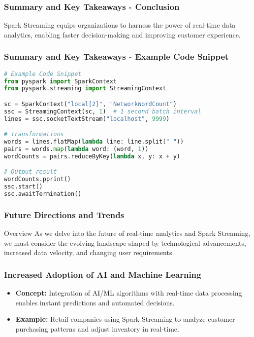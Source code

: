 \documentclass[aspectratio=169]{beamer}
\begin{document}
\begin{frame}
    \frametitle{Summary and Key Takeaways - Conclusion}
    Spark Streaming equips organizations to harness the power of real-time data analytics, enabling faster decision-making and improving customer experience.
\end{frame}

\begin{frame}[fragile]
    \frametitle{Summary and Key Takeaways - Example Code Snippet}
    \begin{lstlisting}[language=python]
# Example Code Snippet
from pyspark import SparkContext
from pyspark.streaming import StreamingContext

sc = SparkContext("local[2]", "NetworkWordCount")
ssc = StreamingContext(sc, 1)  # 1 second batch interval
lines = ssc.socketTextStream("localhost", 9999)

# Transformations
words = lines.flatMap(lambda line: line.split(" "))
pairs = words.map(lambda word: (word, 1))
wordCounts = pairs.reduceByKey(lambda x, y: x + y)

# Output result
wordCounts.pprint()
ssc.start()
ssc.awaitTermination()
    \end{lstlisting}
\end{frame}

\begin{frame}[fragile]
    \frametitle{Future Directions and Trends}
    \begin{block}{Overview}
        As we delve into the future of real-time analytics and Spark Streaming, we must consider the evolving landscape shaped by technological advancements, increased data velocity, and changing user requirements.
    \end{block}
\end{frame}

\begin{frame}[fragile]
    \frametitle{Increased Adoption of AI and Machine Learning}
    \begin{itemize}
        \item \textbf{Concept:} Integration of AI/ML algorithms with real-time data processing enables instant predictions and automated decisions.
        \item \textbf{Example:} Retail companies using Spark Streaming to analyze customer purchasing patterns and adjust inventory in real-time.
    \end{itemize}
\end{frame}
\end{document}
